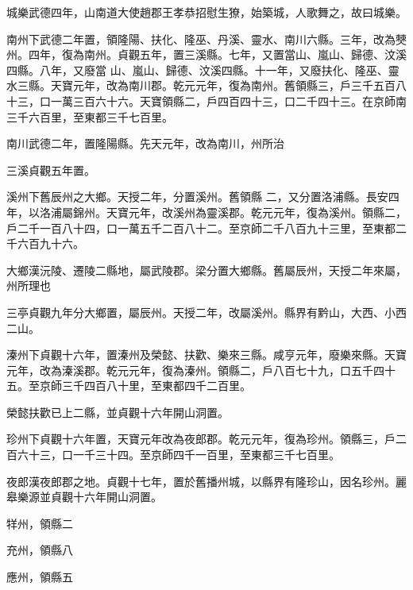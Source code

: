 \begin{pinyinscope}
 城樂武德四年，山南道大使趙郡王孝恭招慰生獠，始築城，人歌舞之，故曰城樂。



 南州下武德二年置，領隆陽、扶化、隆巫、丹溪、靈水、南川六縣。三年，改為僰州。四年，復為南州。貞觀五年，置三溪縣。七年，又置當山、嵐山、歸德、汶溪四縣。八年，又廢當
 山、嵐山、歸德、汶溪四縣。十一年，又廢扶化、隆巫、靈水三縣。天寶元年，改為南川郡。乾元元年，復為南州。舊領縣三，戶三千五百八十三，口一萬三百六十六。天寶領縣二，戶四百四十三，口二千四十三。在京師南三千六百里，至東都三千七百里。



 南川武德二年，置隆陽縣。先天元年，改為南川，州所治



 三溪貞觀五年置。



 溪州下舊辰州之大鄉。天授二年，分置溪州。舊領縣
 二，又分置洛浦縣。長安四年，以洛浦屬錦州。天寶元年，改溪州為靈溪郡。乾元元年，復為溪州。領縣二，戶二千一百八十四，口一萬五千二百八十二。至京師二千八百九十三里，至東都二千六百九十六。



 大鄉漢沅陵、遷陵二縣地，屬武陵郡。梁分置大鄉縣。舊屬辰州，天授二年來屬，州所理也



 三亭貞觀九年分大鄉置，屬辰州。天授二年，改屬溪州。縣界有黔山，大西、小西二山。



 溱州下貞觀十六年，置溱州及榮懿、扶歡、樂來三縣。咸亨元年，廢樂來縣。天寶元年，改為溱溪郡。乾元元年，復為溱州。領縣二，戶八百七十九，口五千四十五。至京師三千四百八十里，至東都四千二百里。



 榮懿扶歡已上二縣，並貞觀十六年開山洞置。



 珍州下貞觀十六年置，天寶元年改為夜郎郡。乾元元年，復為珍州。領縣三，戶二百六十三，口一千三十四。至京師四千一百里，至東都三千七百里。



 夜郎漢夜郎郡之地。貞觀十七年，置於舊播州城，以縣界有隆珍山，因名珍州。麗皋樂源並貞觀十六年開山洞置。



 䍧州，領縣二



 充州，領縣八



 應州，領縣五




\end{pinyinscope}
